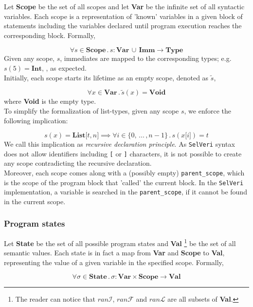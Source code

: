\documentclass{article}
\begin{document}
Let \textbf{Scope} be the set of all scopes and let \textbf{Var} be the infinite set of all syntactic variables. Each scope is a representation  of 'known' variables in a given block of statements including the variables declared until program execution reaches the corresponding block. Formally,

\[
\forall s \in \textbf{Scope} \, . \, s: \textbf{Var} \,\cup\, \textbf{Imm}  \rightarrow \textbf{Type}
\]
Given any scope, $s$, immediates are mapped to the corresponding types; e.g. $s(5) = \textbf{Int}$, , as expected.\\

Initially, each scope starts its lifetime as an empty scope, denoted as $\tilde{s}$, 

\[
\forall x \in \textbf{Var} \, . \,\tilde{s}(x) = \textbf{Void}
\]
where \textbf{Void} is the empty type.\\

To simplify the formalization of list-types, given any scope $s$, we enforce the following implication:

\[
s(x) = \textbf{List[$t,n$]}
\implies
\forall i \in \{0, \,...\, , n-1\} \,.\, s(x\texttt{[$i$]}) = t
\]
We call this implication as \textit{recursive declaration principle}. As \texttt{SelVeri} syntax does not allow identifiers including \texttt{[} or \texttt{]} characters, it is not possible to create any scope contradicting the recursive declaration. \\

Moreover, each scope comes along with a (possibly empty) \texttt{parent\_scope}, which is the scope of the program block that 'called' the current block. In the \texttt{SelVeri} implementation, a variable is searched in the \texttt{parent\_scope}, if it cannot be found in the current scope.


\subsubsection{Program states}

Let \textbf{State} be the set of all possible program states and \textbf{Val} \footnote{The reader can notice that $ran\mathcal{I}$, $ran\mathcal{F}$ and $ran\mathcal{L}$ are all subsets of \textbf{Val}.} be the set of all semantic values. Each state is in fact a map from \textbf{Var} and \textbf{Scope} to \textbf{Val}, representing the value of a given variable in the specified scope. Formally,

\[
\forall \sigma \in \textbf{State} \, . \, \sigma: \textbf{Var} \times \textbf{Scope} \rightarrow \textbf{Val}
\]
\end{document}
